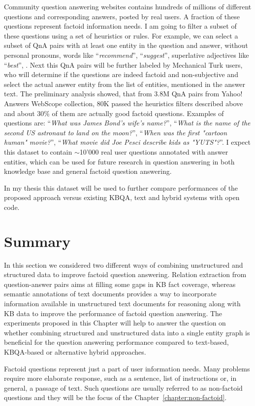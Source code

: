 
Community question answering websites contains hundreds of millions of different questions and corresponding answers, posted by real users.
A fraction of these questions represent factoid information needs.
I am going to filter a subset of these questions using a set of heuristics or rules.
For example, we can select a subset of QnA pairs with at least one entity in the question and answer, without personal pronouns, words like ``\textit{recommend}'', ``\textit{suggest}'', superlative adjectives like ``\textit{best}'', \etc.
Next this QnA pairs will be further labeled by Mechanical Turk users, who will determine if the questions are indeed factoid and non-subjective and select the actual answer entity from the list of entities, mentioned in the answer text.
The preliminary analysis showed, that from 3.8M QnA pairs from Yahoo! Answers WebScope collection, 80K passed the heuristics filters described above and about 30\% of them are actually good factoid questions.
Examples of questions are: ``\textit{What was James Bond's wife's name?}'', ``\textit{What is the name of the second US astronaut to land on the moon?}'', ``\textit{When was the first "cartoon human" movie?}'', ``\textit{What movie did Joe Pesci describe kids as "YUTS"?}''.
I expect this dataset to contain $\sim$10'000 real user questions annotated with answer entities, which can be used for future research in question answering in both knowledge base and general factoid question answering.

In my thesis this dataset will be used to further compare performances of the proposed approach versus existing KBQA, text and hybrid systems with open code.

\section{Summary}
\label{section:factoid:summary}

In this section we considered two different ways of combining unstructured and structured data to improve factoid question answering.
Relation extraction from question-answer pairs aims at filling some gaps in KB fact coverage, whereas semantic annotations of text documents provides a way to incorporate information available in unstructured text documents for reasoning along with KB data to improve the performance of factoid question answering.
The experiments proposed in this Chapter will help to answer the question on whether combining structured and unstructured data into a single entity graph is beneficial for the question answering performance compared to text-based, KBQA-based or alternative hybrid approaches.

Factoid questions represent just a part of user information needs. Many problems require more elaborate response, such as a sentence, list of instructions or, in general, a passage of text.
Such questions are usually referred to as non-factoid questions and they will be the focus of the Chapter~\ref{chapter:non-factoid}.